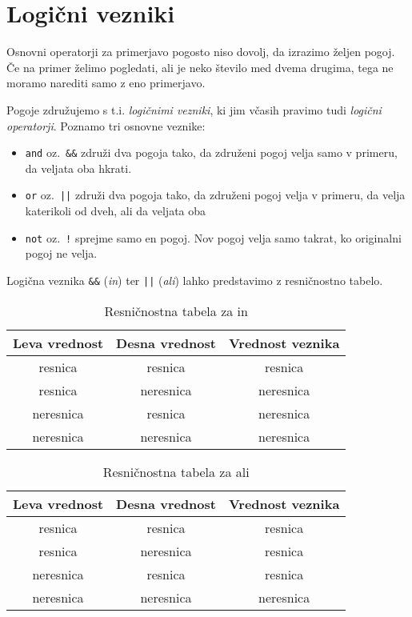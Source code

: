 \section{Logični vezniki}

Osnovni operatorji za primerjavo pogosto niso dovolj, da izrazimo željen pogoj.
Če na primer želimo pogledati, ali je neko število med dvema drugima, tega ne
moramo narediti samo z eno primerjavo.

Pogoje združujemo s t.i. \emph{logičnimi vezniki}, ki jim včasih pravimo tudi
\emph{logični operatorji}. Poznamo tri osnovne veznike:
\begin{itemize}
  \item \verb+and+ oz.~\verb+&&+ združi dva pogoja tako, da združeni pogoj velja
	samo v primeru, da veljata oba hkrati.
  \item \verb+or+ oz.~\verb+||+ združi dva pogoja tako, da združeni pogoj velja
	v primeru, da velja katerikoli od dveh, ali da veljata oba
  \item \verb+not+ oz.~\verb+!+ sprejme samo en pogoj. Nov pogoj velja samo
	takrat, ko originalni pogoj ne velja.
\end{itemize}

Logična veznika \verb+&&+ (\emph{in}) ter \verb+||+ (\emph{ali}) lahko
predstavimo z resničnostno tabelo.

\begin{table}[h!]
  \centering
  \caption{Resničnostna tabela za in}
  \vspace{0.1cm}
  \begin{tabular}{c|c|c}
	Leva vrednost & Desna vrednost & Vrednost veznika \\
	\hline
	resnica & resnica & resnica \\
	resnica & neresnica & neresnica \\
	neresnica & resnica & neresnica \\
	neresnica & neresnica & neresnica
  \end{tabular}
\end{table}

\begin{table}[h!]
  \centering
  \caption{Resničnostna tabela za ali}
  \vspace{0.1cm}
  \begin{tabular}{c|c|c}
	Leva vrednost & Desna vrednost & Vrednost veznika \\
	\hline
	resnica & resnica & resnica \\
	resnica & neresnica & resnica \\
	neresnica & resnica & resnica \\
	neresnica & neresnica & neresnica
  \end{tabular}
\end{table}

